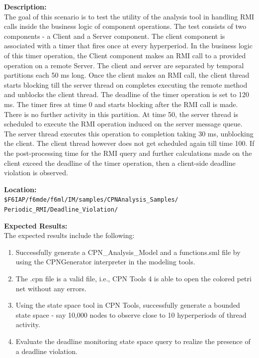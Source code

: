 \noindent\textbf{Description:}\\
The goal of this scenario is to test the utility of the analysis tool in handling RMI calls inside the business logic of component operations. The test consists of two components - a Client and a Server component. The client component is associated with a timer that fires once at every hyperperiod. In the business logic of this timer operation, the Client component makes an RMI call to a provided operation on a remote Server. The client and server are separated by temporal partitions each 50 ms long. Once the client makes an RMI call, the client thread starts blocking till the server thread on completes executing the remote method and unblocks the client thread. The deadline of the timer operation is set to 120 ms. The timer fires at time 0 and starts blocking after the RMI call is made. There is no further activity in this partition. At time 50, the server thread is scheduled to execute the RMI operation induced on the server message queue. The server thread executes this operation to completion taking 30 ms, unblocking the client. The client thread however does not get scheduled again till time 100. If the post-processing time for the RMI query and further calculations made on the client exceed the deadline of the timer operation, then a client-side deadline violation is observed.

\noindent\textbf{Location:}\\
\texttt{\$F6IAP/f6mde/f6ml/IM/samples/CPNAnalysis\_Samples/ \\ Periodic\_RMI/Deadline\_Violation/}

\noindent\textbf{Expected Results:}\\

The expected results include the following: 

\begin{enumerate}
\item Successfully generate a CPN\_Analysis\_Model and a functions.sml file by using the CPNGenerator interpreter in the modeling tools.
\item The .cpn file is a valid file, i.e., CPN Tools 4 is able to open the colored petri net without any errors.
\item Using the state space tool in CPN Tools, successfully generate a bounded state space - say 10,000 nodes to observe close to 10 hyperperiods of thread activity.
\item Evaluate the deadline monitoring state space query to realize the presence of a deadline violation.
\end{enumerate}

